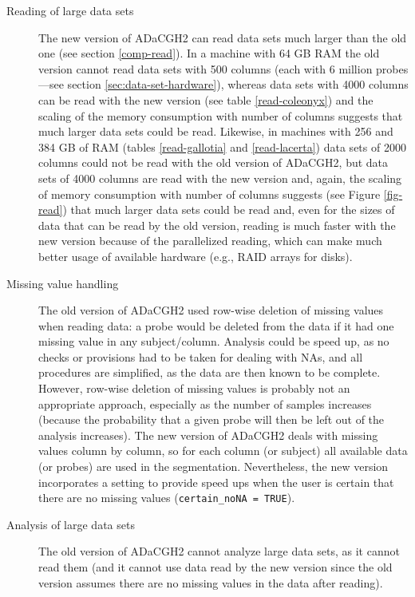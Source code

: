 \documentclass[a4paper,11pt]{article}
\begin{document}
\begin{description}

\item[Reading of large data sets] The new version of ADaCGH2 can read data
  sets much larger than the old one (see section \ref{comp-read}). In a
  machine with 64 GB RAM the old version cannot read data sets with 500
  columns (each with 6 million probes ---see section
  \ref{sec:data-set-hardware}), whereas data sets with 4000 columns can be
  read with the new version (see table \ref{read-coleonyx}) and the
  scaling of the memory consumption with number of columns suggests that
  much larger data sets could be read. Likewise, in machines with 256 and
  384 GB of RAM (tables \ref{read-gallotia} and \ref{read-lacerta}) data
  sets of 2000 columns could not be read with the old version of ADaCGH2,
  but data sets of 4000 columns are read with the new version and, again,
  the scaling of memory consumption with number of columns suggests (see
  Figure \ref{fig-read}) that much larger data sets could be read and,
  even for the sizes of data that can be read by the old version, reading
  is much faster with the new version because of the parallelized reading,
  which can make much better usage of available hardware (e.g., RAID
  arrays for disks). %



\item[Missing value handling] The old version of ADaCGH2 used row-wise
  deletion of missing values when reading data: a probe would be deleted
  from the data if it had one missing value in any
  subject/column. Analysis could be speed up, as no checks or provisions
  had to be taken for dealing with NAs, and all procedures are simplified,
  as the data are then known to be complete. However, row-wise deletion of
  missing values is probably not an appropriate approach, especially as
  the number of samples increases (because the probability that a given
  probe will then be left out of the analysis increases). The new version
  of ADaCGH2 deals with missing values column by column, so for each
  column (or subject) all available data (or probes) are used in the
  segmentation. Nevertheless, the new version incorporates a setting to
  provide speed ups when the user is certain that there are no missing
  values (\texttt{certain\_noNA = TRUE}).


\item[Analysis of large data sets] The old version of ADaCGH2 cannot
  analyze large data sets, as it cannot read them (and it cannot use data
  read by the new version since the old version assumes there are no
  missing values in the data after reading).


\end{description}
\end{document}
